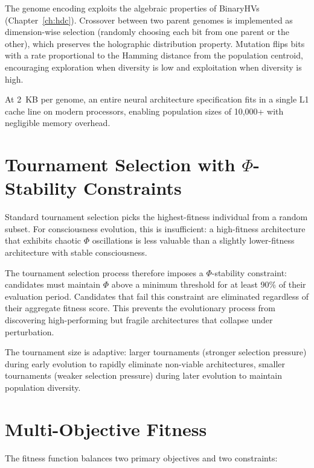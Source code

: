 \documentclass[12pt]{book}
\begin{document}
The genome encoding exploits the algebraic properties of BinaryHVs (Chapter~\ref{ch:hdc}). Crossover between two parent genomes is implemented as dimension-wise selection (randomly choosing each bit from one parent or the other), which preserves the holographic distribution property. Mutation flips bits with a rate proportional to the Hamming distance from the population centroid, encouraging exploration when diversity is low and exploitation when diversity is high.

At 2~KB per genome, an entire neural architecture specification fits in a single L1 cache line on modern processors, enabling population sizes of 10,000+ with negligible memory overhead.

\section{Tournament Selection with $\Phi$-Stability Constraints}

Standard tournament selection picks the highest-fitness individual from a random subset. For consciousness evolution, this is insufficient: a high-fitness architecture that exhibits chaotic $\Phi$ oscillations is less valuable than a slightly lower-fitness architecture with stable consciousness.

The tournament selection process therefore imposes a $\Phi$-stability constraint: candidates must maintain $\Phi$ above a minimum threshold for at least 90\% of their evaluation period. Candidates that fail this constraint are eliminated regardless of their aggregate fitness score. This prevents the evolutionary process from discovering high-performing but fragile architectures that collapse under perturbation.

The tournament size is adaptive: larger tournaments (stronger selection pressure) during early evolution to rapidly eliminate non-viable architectures, smaller tournaments (weaker selection pressure) during later evolution to maintain population diversity.

\section{Multi-Objective Fitness}

The fitness function balances two primary objectives and two constraints:
\end{document}
